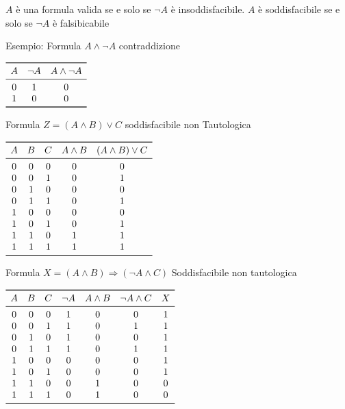 \begin{thm}
$A$ è una formula valida se e solo se $\neg A$ è insoddisfacibile.
$A$ è soddisfacibile se e solo se $\neg A$ è falsibicabile
\end{thm}


Esempio:\newline
Formula $A \land \neg A$ \quad contraddizione

$\begin{array}{ccc}
\toprule A & \neg A & A \land \neg A \\
\midrule
        0 & 1 & 0 \\
        1 & 0 & 0 \\
\bottomrule
\end{array}$\newpage

Formula $Z = (A \land B) \lor C$  soddisfacibile non Tautologica

$\begin{array}{ccccc}
\toprule A & B & C & A \land B & (A \land B) \lor C \\
\midrule
         0 & 0 & 0 & 0 & 0 \\
         0 & 0 & 1 & 0 & 1 \\
         0 & 1 & 0 & 0 & 0 \\
         0 & 1 & 1 & 0 & 1 \\
         1 & 0 & 0 & 0 & 0 \\
         1 & 0 & 1 & 0 & 1 \\
         1 & 1 & 0 & 1 & 1 \\
         1 & 1 & 1 & 1 & 1 \\
\bottomrule
\end{array}$\newline

Formula $X = (A \land B) \Rightarrow (\neg A \land C)$ \quad Soddisfacibile  non tautologica\newline

$\begin{array}{ccccccc}
\toprule A & B & C & \neg A & A \land B & \neg A \land C & X\\
\midrule
         0 & 0 & 0 & 1 & 0 & 0 & 1 \\
         0 & 0 & 1 & 1 & 0 & 1 & 1 \\
         0 & 1 & 0 & 1 & 0 & 0 & 1 \\
         0 & 1 & 1 & 1 & 0 & 1 & 1 \\
         1 & 0 & 0 & 0 & 0 & 0 & 1 \\
         1 & 0 & 1 & 0 & 0 & 0 & 1 \\
         1 & 1 & 0 & 0 & 1 & 0 & 0 \\
         1 & 1 & 1 & 0 & 1 & 0 & 0 \\
\bottomrule
\end{array}$ \newline

